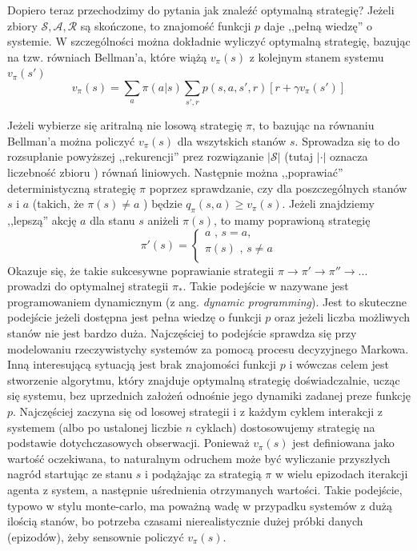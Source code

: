 \documentclass[licencjacka]{pracamgr}
\begin{document}
Dopiero teraz przechodzimy do pytania jak znaleźć optymalną strategię? Jeżeli zbiory  $\mathcal{S}, \mathcal{A}, \mathcal{R}$ są skończone, to znajomość funkcji $p$ daje ,,pełną wiedzę'' o systemie. W szczególności można dokładnie wyliczyć optymalną strategię, bazując na tzw. równiach Bellman'a, które wiążą $v_{\pi}(s)$ z kolejnym stanem systemu $v_{\pi}(s')$
$$v_{\pi}(s) = \sum_{a}\pi(a|s)\sum_{s',r}p(s,a,s',r)[r +\gamma v_{\pi}(s')] $$

Jeżeli wybierze się aritralną nie losową strategię $\pi$, to bazując na równaniu Bellman'a można policzyć $v_{\pi}(s)$ dla wszytskich stanów $s$. Sprowadza się to do rozsupłanie powyższej ,,rekurencji''  prez rozwiązanie $|\mathcal{S}|$  (tutaj $|\cdot|$ oznacza liczebność zbioru ) równań liniowych.  Następnie można ,,poprawiać'' deterministyczną strategię $\pi$ poprzez sprawdzanie, czy dla poszczególnych stanów $s$ i $a$ (takich, że $\pi(s)\neq a$ ) będzie $q_{\pi}(s,a)\geq v_{\pi}(s)$. Jeżeli znajdziemy ,,lepszą'' akcję $a$  dla stanu $s$ aniżeli $\pi(s)$, to mamy poprawioną strategię 
$$\pi'(s) =
	\begin{cases}
		a\text{ ,  }s=a,\\			
		\pi(s)\text{ , } s\neq a\\
	\end{cases}
$$
 Okazuje się, że takie sukcesywne poprawianie strategii $\pi\rightarrow\pi'\rightarrow\pi''\rightarrow ...$ prowadzi do optymalnej strategii $\pi_{*}$. Takie podejście w \cite{RL} nazywane jest programowaniem dynamicznym (z ang. \textit{dynamic programming}). Jest to skuteczne podejście jeżeli dostępna jest  pełna wiedzę o funkcji $p$ oraz jeżeli liczba możliwych stanów nie jest bardzo duża. Najczęściej to podejście sprawdza się przy modelowaniu rzeczywistychy systemów za pomocą procesu decyzyjnego Markowa.\\

Inną interesującą sytuacją jest brak znajomości funkcji $p$ i wówczas celem jest stworzenie algorytmu, który znajduje optymalną strategię doświadczalnie, ucząc się systemu, bez uprzednich założeń odnośnie jego dynamiki zadanej preze funkcję $p$. Najczęściej zaczyna się od losowej strategii i z każdym cyklem interakcji z systemem (albo po ustalonej liczbie  $n$ cyklach) dostosowujemy strategię na podstawie dotychczasowych obserwacji. Ponieważ $v_{\pi}(s)$ jest definiowana jako wartość oczekiwana, to naturalnym odruchem może być wyliczanie przyszłych nagród startując ze stanu $s$ i podążając za strategią $\pi$ w wielu epizodach iterakcji agenta z system, a następnie uśrednienia otrzymanych wartości. Takie podejście, typowo w stylu monte-carlo, ma poważną wadę w przypadku systemów z dużą ilością stanów, bo potrzeba czasami nierealistycznie dużej próbki danych (epizodów), żeby sensownie policzyć  $v_{\pi}(s)$. \\
 
\end{document}
